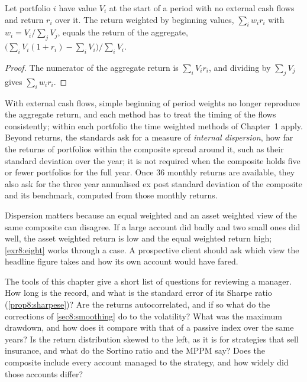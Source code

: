 \begin{chapterrefs}
\begin{proposition}\label{prop8:composite}
Let portfolio $i$ have value $V_i$ at the start of a period with no external cash flows and return
$r_i$ over it. The return weighted by beginning values, $\sum_iw_ir_i$ with $w_i=V_i/\sum_jV_j$, equals the
return of the aggregate, $\bigl(\sum_iV_i(1+r_i)-\sum_iV_i\bigr)/\sum_iV_i$.
\end{proposition}
\begin{proof}
The numerator of the aggregate return is $\sum_iV_ir_i$, and dividing by $\sum_jV_j$ gives
$\sum_iw_ir_i$.
\end{proof}

With external cash flows, simple beginning of period weights no longer reproduce the aggregate return,
and each method has to treat the timing of the flows consistently; within each portfolio the time
weighted methods of Chapter~1 apply. Beyond returns, the standards ask for a measure of \emph{internal dispersion}, how far
the returns of portfolios within the composite spread around it, such as their standard deviation over
the year; it is not required when the composite holds five or fewer portfolios for the full year. Once 36
monthly returns are available, they also ask for the three year annualised ex post standard deviation
of the composite and its benchmark, computed from those monthly returns.

Dispersion matters because an equal weighted and an asset weighted view of the same composite can
disagree. If a large account did badly and two small ones did well, the asset weighted return is low
and the equal weighted return high; \cref{exr8:eight} works through a case. A prospective client
should ask which view the headline figure takes and how its own account would have fared.

The tools of this chapter give a short list of questions for reviewing a manager. How long is the
record, and what is the standard error of its Sharpe ratio (\cref{prop8:sharpese})? Are the returns
autocorrelated, and if so what do the corrections of \cref{sec8:smoothing} do to the volatility? What
was the maximum drawdown, and how does it compare with that of a passive index over the same years? Is
the return distribution skewed to the left, as it is for strategies that sell insurance, and what do
the Sortino ratio and the MPPM say? Does the composite include every account managed to the strategy,
and how widely did those accounts differ?


\end{chapterrefs}
